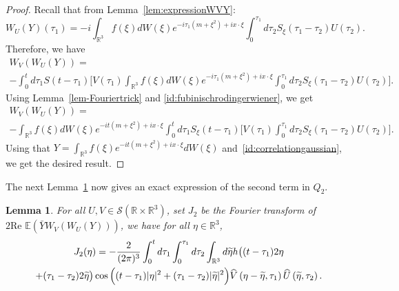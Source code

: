 \documentclass[10pt]{amsart}
\newtheorem{lemm}[theo]{Lemma}\newtheorem{prop}[theo]{Proposition}\newtheorem{coro}[theo]{Corollary}\newtheorem{conj}[theo]{Conjecture}
\theoremstyle{definition}\newtheorem{defi}[theo]{Definition}\newtheorem{rema}[theo]{Remark}\newtheorem{exam}[theo]{Example}\newtheorem{exem}[theo]{Example}\newtheorem{nota}[theo]{Notation}
\newcommand{\R}{\mathbb{R}}
\newcommand{\E}{\mathbb{E}}
\newcommand{\mclS}{\mathcal{S}}
\let\oldtilde\tilde
\renewcommand*{\tilde}[1]{\mathchoice{\widetilde{#1}}{\widetilde{#1}}{\oldtilde{#1}}{\oldtilde{#1}}}
\let\oldhat\hat
\renewcommand*{\hat}[1]{\mathchoice{\widehat{#1}}{\widehat{#1}}{\oldhat{#1}}{\oldhat{#1}}}
\begin{document}
\begin{proof}
Recall that from Lemma~\ref{lem:expressionWVY}:
\[
W_U(Y)(\tau_1) = -i\int_{\R^3} f(\xi) dW(\xi) e^{-i\tau_1\left(m+\xi^2\right) + ix\cdot \xi} \int_{0}^{\tau_1}d\tau_2 S_\xi(\tau_1 - \tau_2) U(\tau_2).
\]
Therefore, we have
\begin{multline*}
W_V\left(W_U (Y)\right) =\\
 - \int_{0}^t d\tau_1 S(t-\tau_1) \Big[V(\tau_1) \int_{\R^3} f(\xi) dW(\xi) e^{-i\tau_1 \left(m+\xi^2\right) + ix\cdot \xi} \int_{0}^{\tau_1}d\tau_2 S_\xi(\tau_1 - \tau_2) U(\tau_2)\Big].
\end{multline*}
Using Lemma~\ref{lem-Fouriertrick} and \eqref{id:fubinischrodingerwiener}, we get
\begin{multline*}
W_V\left(W_U(Y)\right) = \\
- \int_{\R^3} f(\xi) dW(\xi) e^{-it\left(m+\xi^2\right) + ix\cdot \xi} \int_{0}^t d\tau_1 S_\xi(t-\tau_1) \Big[V(\tau_1) \int_{0}^{\tau_1} d\tau_2 S_\xi(\tau_1 - \tau_2) U(\tau_2)\Big].
\end{multline*}
Using that $Y = \int_{\R^3} f(\xi) e^{-it(m+\xi^2) + ix\cdot \xi} d W(\xi)$ and~\eqref{id:correlationgaussian}, we get the desired result.
\end{proof}


The next Lemma~\ref{lem:exprQ22} now gives an exact expression of the second term in $Q_2$.


\begin{lemm}\label{lem:exprQ22}
For all $U,V\in \mclS(\R\times \R^3)$, set $J_2$ be the Fourier transform of $2\textrm{Re }\E(\bar Y W_V(W_U(Y)))$, we have for all $\eta \in \R^3$,
\begin{multline*}
J_2(\eta) = -\frac{2}{(2\pi)^3} \int_{0}^t d\tau_1 \int_{0}^{\tau_1} d\tau_2 \int_{\R^3} d\tilde{\eta} h\big((t-\tau_1)2\eta\\
+ (\tau_1 - \tau_2) 2\tilde{\eta}\big) \cos \Big((t-\tau_1) |\eta|^2 + (\tau_1 - \tau_2) |\tilde{\eta}|^2 \Big) 
\hat V\left(\eta - \tilde{\eta}, \tau_1\right) \hat U\left(\tilde{\eta},\tau_2\right).
\end{multline*}
\end{lemm}
\end{document}
